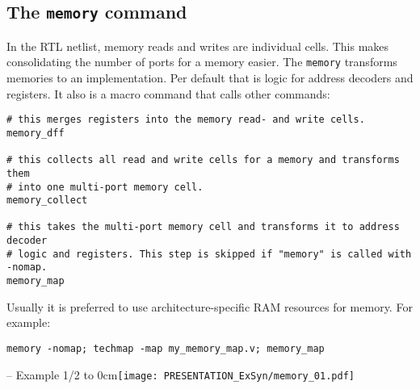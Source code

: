 
\subsection{The {\tt memory} command}

\begin{frame}[fragile]{\subsecname}
In the RTL netlist, memory reads and writes are individual cells. This makes
consolidating the number of ports for a memory easier. The {\tt memory}
transforms memories to an implementation. Per default that is logic for address
decoders and registers. It also is a macro command that calls other commands:

\begin{lstlisting}[xleftmargin=0.5cm, basicstyle=\ttfamily\fontsize{8pt}{10pt}\selectfont, language=ys]
# this merges registers into the memory read- and write cells.
memory_dff

# this collects all read and write cells for a memory and transforms them
# into one multi-port memory cell.
memory_collect

# this takes the multi-port memory cell and transforms it to address decoder
# logic and registers. This step is skipped if "memory" is called with -nomap.
memory_map
\end{lstlisting}

\bigskip
Usually it is preferred to use architecture-specific RAM resources for memory.
For example:

\begin{lstlisting}[xleftmargin=0.5cm, basicstyle=\ttfamily\fontsize{8pt}{10pt}\selectfont, language=ys]
memory -nomap; techmap -map my_memory_map.v; memory_map
\end{lstlisting}
\end{frame}

\begin{frame}[t, fragile]{\subsecname{} -- Example 1/2}
\vbox to 0cm{\texttt{[image: PRESENTATION\_ExSyn/memory\_01.pdf]}\vss}
\vskip-1cm
\begin{columns}
\column[t]{5cm}

\column[t]{5cm}

\end{columns}
\end{frame}

